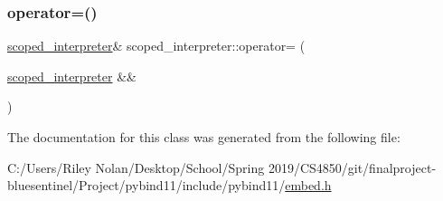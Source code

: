 \mbox{\label{classscoped__interpreter_acdda686792144d2fb682491d19a803b5}} 
\subsubsection{\texorpdfstring{operator=()}{operator=()}\hspace{0.1cm}{\footnotesize\ttfamily [2/2]}}
{\footnotesize\ttfamily \mbox{\hyperlink{classscoped__interpreter}{scoped\+\_\+interpreter}}\& scoped\+\_\+interpreter\+::operator= (\begin{DoxyParamCaption}\item[{\mbox{\hyperlink{classscoped__interpreter}{scoped\+\_\+interpreter}} \&\&}]{ }\end{DoxyParamCaption})\hspace{0.3cm}{\ttfamily [delete]}}



The documentation for this class was generated from the following file\+:\begin{DoxyCompactItemize}
\item 
C\+:/\+Users/\+Riley Nolan/\+Desktop/\+School/\+Spring 2019/\+C\+S4850/git/finalproject-\/bluesentinel/\+Project/pybind11/include/pybind11/\mbox{\hyperlink{embed_8h}{embed.\+h}}\end{DoxyCompactItemize}
